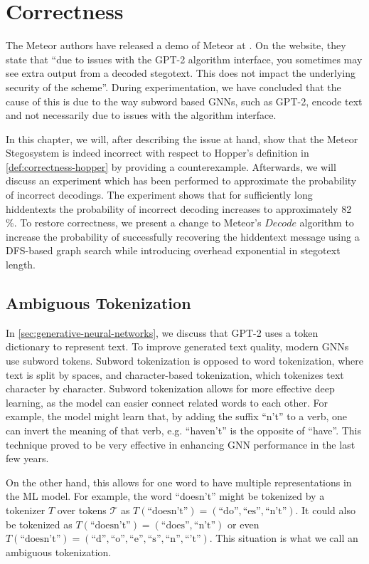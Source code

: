 \chapter{Correctness}
\label{chap:correctness}

The Meteor authors have released a demo of Meteor at \cite{MeteorDemo2021}. On the website, they state that ``due to issues with the GPT-2 algorithm interface, you sometimes may see extra output from a decoded stegotext. This does not impact the underlying security of the scheme''.
During experimentation,  we have concluded that the cause of this is due to the way subword based GNNs, such as GPT-2, encode text and not necessarily due to issues with the algorithm interface.

In this chapter, we will, after describing the issue at hand, show that the Meteor Stegosystem is indeed incorrect with respect to Hopper's definition in \autoref{def:correctness-hopper} by providing a counterexample.
Afterwards, we will discuss an experiment which has been performed to approximate the probability of incorrect decodings.
The experiment shows that for sufficiently long hiddentexts the probability of incorrect decoding increases to approximately 82 \%.
To restore correctness, we present a change to Meteor's $Decode$ algorithm to increase the probability of successfully recovering the hiddentext message using a DFS-based graph search while introducing overhead exponential in stegotext length.

\section{Ambiguous Tokenization}

In \autoref{sec:generative-neural-networks}, we discuss that GPT-2 uses a token dictionary to represent text.
To improve generated text quality, modern GNNs use subword tokens.
Subword tokenization is opposed to word tokenization, where text is split by spaces, and character-based tokenization, which tokenizes text character by character.
Subword tokenization allows for more effective deep learning, as the model can easier connect related words to each other. 
For example, the model might learn that, by adding the suffix ``n't'' to a verb, one can invert the meaning of that verb, e.g. ``haven't'' is the opposite of ``have''.
This technique proved to be very effective in enhancing GNN performance in the last few years.

On the other hand, this allows for one word to have multiple representations in the ML model.
For example, the word ``doesn't'' might be tokenized by a tokenizer $T$ over tokens $\mathcal{T}$ as $T(\textrm{``doesn't''}) = ( \textrm{``do''}, \textrm{``es''}, \textrm{``n't''} )$.
It could also be tokenized as $T(\textrm{``doesn't''}) = ( \textrm{``does''}, \textrm{``n't''} )$ or even $T(\textrm{``doesn't''}) = ( \textrm{``d''}, \textrm{``o''}, \textrm{``e''}, \textrm{``s''}, \textrm{``n''}, \textrm{``'t''})$.
This situation is what we call an ambiguous tokenization.

